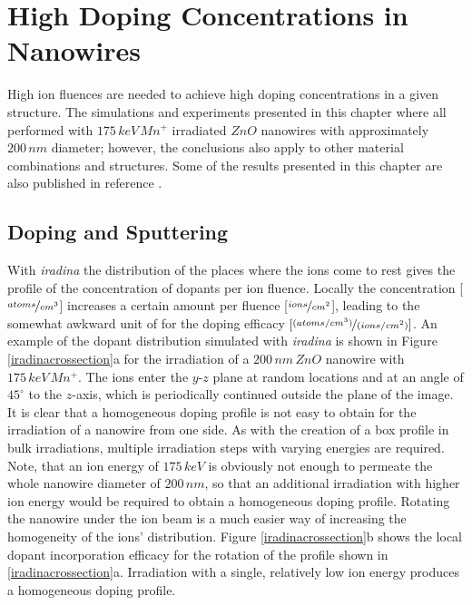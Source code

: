 \chapter{High Doping Concentrations in Nanowires}
\label{sec:high}

High ion fluences are needed to achieve high doping concentrations in a given structure. The simulations and experiments presented in this chapter where all performed with $175\, keV\,Mn^+$ irradiated $ZnO$ nanowires with approximately $200\,nm$ diameter; however, the conclusions also apply to other material combinations and structures. Some of the results presented in this chapter are also published in reference \cite{johannes_enhanced_2014}.

\section{Doping and Sputtering}

With \emph{iradina} the distribution of the places where the ions come to rest gives the profile of the concentration of dopants per ion fluence. Locally the concentration [$\nicefrac{atoms}{cm^{3}}$] increases a certain amount per fluence [$\nicefrac{ions}{cm^{2}}$], leading to the somewhat awkward unit of for the doping efficacy $[\nicefrac{(atoms/cm^{3})}{(ions/cm^{2})}]$. An example of the dopant distribution simulated with \emph{iradina} is shown in Figure \ref{iradinacrossection}a for the irradiation of a $200\,nm\,ZnO$ nanowire with $175\,keV\,Mn^+$. The ions enter the $y$-$z$ plane at random locations and at an angle of $45^\circ$ to the $z$-axis, which is periodically continued outside the plane of the image. It is clear that a homogeneous doping profile is not easy to obtain for the irradiation of a nanowire from one side. As with the creation of a box profile in bulk irradiations, multiple irradiation steps with varying energies are required. Note, that an ion energy of $175\,keV$ is obviously not enough to permeate the whole nanowire diameter of $200\,nm$, so that an additional irradiation with higher ion energy would be required to obtain a homogeneous doping profile. Rotating the nanowire under the ion beam is a much easier way of increasing the homogeneity of the ions' distribution. Figure \ref{iradinacrossection}b shows the local dopant incorporation efficacy for the rotation of the profile shown in \ref{iradinacrossection}a. Irradiation with a single, relatively low ion energy produces a homogeneous doping profile. 
  
